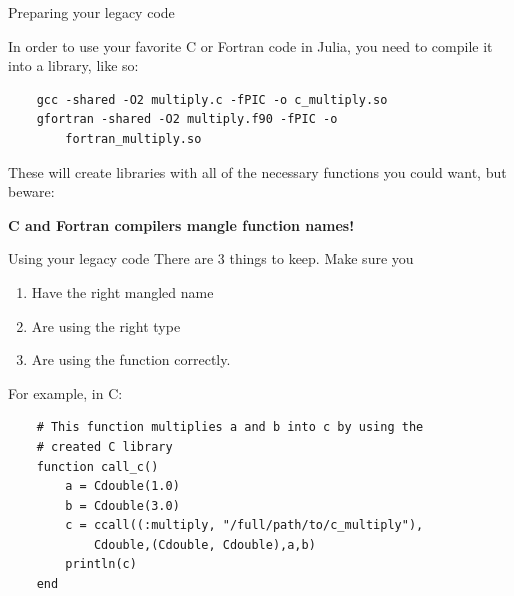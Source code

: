 \documentclass{beamer}
\begin{document}
\begin{frame}[fragile]{Preparing your legacy code}

In order to use your favorite C or Fortran code in Julia, you need to compile it into a library, like so:

\begin{lstlisting}
    gcc -shared -O2 multiply.c -fPIC -o c_multiply.so
    gfortran -shared -O2 multiply.f90 -fPIC -o 
        fortran_multiply.so
\end{lstlisting}

\pause
These will create libraries with all of the necessary functions you could want, but beware:

\begin{center}
\textbf{C and Fortran compilers mangle function names!}
\end{center}
\end{frame}

\begin{frame}[fragile]{Using your legacy code}
There are 3 things to keep. Make sure you 
\begin{enumerate}
\item Have the right mangled name
\item Are using the right type
\item Are using the function correctly.
\end{enumerate}
\pause

\vspace{0.5cm}
For example, in C:
\begin{lstlisting}
    # This function multiplies a and b into c by using the 
    # created C library
    function call_c()
        a = Cdouble(1.0)
        b = Cdouble(3.0)
        c = ccall((:multiply, "/full/path/to/c_multiply"),
            Cdouble,(Cdouble, Cdouble),a,b)
        println(c)
    end
\end{lstlisting}
\end{frame}
\end{document}
